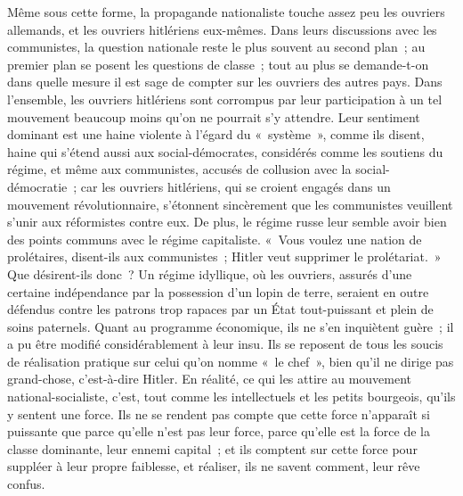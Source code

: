\documentclass[french,twoside]{book} %
\begin{document}
Même sous cette forme, la propagande nationaliste touche assez peu les ouvriers allemands, et les ouvriers hitlériens eux-mêmes. Dans leurs discus­sions avec les communistes, la question nationale reste le plus souvent au second plan ; au premier plan se posent les questions de classe ; tout au plus se demande-t-on dans quelle mesure il est sage de compter sur les ouvriers des autres pays. Dans l'ensemble, les ouvriers hitlériens sont corrompus par leur participation à un tel mouvement beaucoup moins qu'on ne pourrait s'y attendre. Leur sentiment dominant est une haine violente à l'égard du « systè­me », comme ils disent, haine qui s'étend aussi aux social-démocrates, consi­dérés comme les soutiens du régime, et même aux communistes, accusés de collusion avec la social-démocratie ; car les ouvriers hitlériens, qui se croient engagés dans un mouvement révolutionnaire, s'étonnent sincèrement que les communistes veuillent s'unir aux réformistes contre eux. De plus, le régime russe leur semble avoir bien des points communs avec le régime capitaliste. « Vous voulez une nation de prolétaires, disent-ils aux communistes ; Hitler veut supprimer le prolétariat. » Que désirent-ils donc ? Un régime idyllique, où les ouvriers, assurés d'une certaine indépendance par la possession d'un lopin de terre, seraient en outre défendus contre les patrons trop rapaces par un État tout-puissant et plein de soins paternels. Quant au programme économi­que, ils ne s'en inquiètent guère ; il a pu être modifié considérablement à leur insu. Ils se reposent de tous les soucis de réalisation pratique sur celui qu'on nomme « le chef », bien qu'il ne dirige pas grand-chose, c'est-à-dire Hitler. En réalité, ce qui les attire au mouvement national-socialiste, c'est, tout comme les intellectuels et les petits bourgeois, qu'ils y sentent une force. Ils ne se rendent pas compte que cette force n'apparaît si puissante que parce qu'elle n'est pas leur force, parce qu'elle est la force de la classe dominante, leur ennemi capital ; et ils comptent sur cette force pour suppléer à leur propre faiblesse, et réaliser, ils ne savent comment, leur rêve confus.\par
\end{document}
